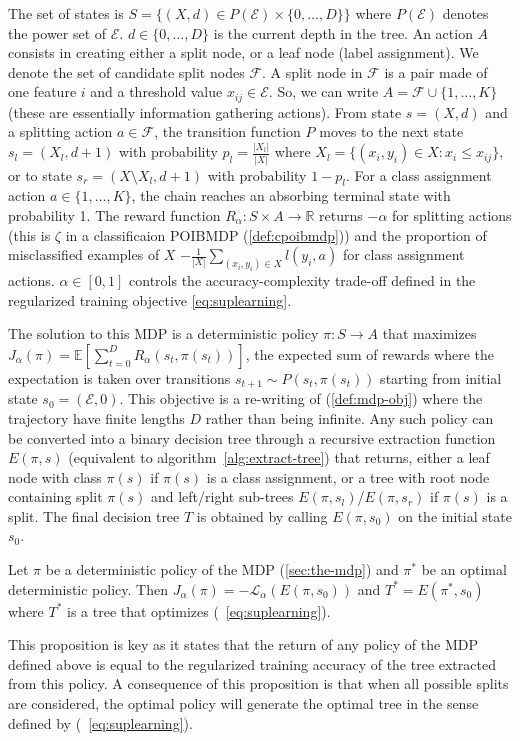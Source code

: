 The set of states is $S = \{ (X, d) \in P(\mathcal{E}) \times \{0, \ldots, D\} \}$ where $P(\mathcal{E})$ denotes the power set of $\mathcal{E}$. $d \in \{0,\ldots,D\}$ is the current depth in the tree.
An action $A$ consists in creating either a split node, or a leaf node (label assignment). We denote the set of candidate split nodes $ {\mathcal F} $. A split node in $\mathcal F$ is a pair made of one feature $i$ and a threshold value $x_{ij}\in \mathcal{E}$.
So, we can write $A = {\mathcal{F} \cup \{ 1, \ldots, K \}}$ (these are essentially information gathering actions).
From state $s=(X,d)$ and a splitting action $a \in {\mathcal F}$, the transition function $P$ moves to the next state $s_l = (X_l, d+1)$ with probability $p_l = \frac{|X_l|}{|X|}$ where $X_l = \{(x_i, y_i) \in X: x_i \leq x_{ij}\}$, or to state $s_r = (X \setminus X_l, d+1)$ with probability $1-p_l$. For a class assignment action $a \in \{1,\ldots,K\}$, the chain reaches an absorbing terminal state with probability 1. 
The reward function $R_{\alpha}: S \times A \rightarrow \mathbb{R}$ returns $-\alpha$ for splitting actions (this is $\zeta$ in a classificaion POIBMDP (\ref{def:cpoibmdp})) and the proportion of misclassified examples of $X$ $-\frac{1}{|X|}\sum_{(x_i,y_i) \in X} l(y_i, a)$ for class assignment actions. $\alpha \in [0,1]$ controls the accuracy-complexity trade-off defined in the regularized training objective \ref{eq:suplearning}. 

The solution to this MDP is a deterministic policy $\pi: S \rightarrow A$ that maximizes {$J_{\alpha}(\pi) ={\mathbb{E}}\left[\sum_{t = 0}^D R_{\alpha}(s_t, \pi(s_t))\right]$\label{def:finite-mdp-obj}}, the expected sum of rewards where the expectation is taken over transitions $s_{t+1}\sim P(s_t, \pi(s_t))$ starting from initial state $s_0 = (\mathcal{E}, 0)$.
This objective is a re-writing of (\ref{def:mdp-obj}) where the trajectory have finite lengths $D$ rather than being infinite.
Any such policy can be converted into a binary decision tree through a recursive extraction function $E(\pi, s)$ (equivalent to algorithm~\ref{alg:extract-tree}) that returns, either a leaf node with class $\pi(s)$ if $\pi(s)$ is a class assignment, or a tree with root node containing split $\pi(s)$ and left/right sub-trees $E(\pi, s_l)$/$E(\pi, s_r)$ if $\pi(s)$ is a split. The final decision tree $T$ is obtained by calling $E(\pi, s_0)$ on the initial state $s_0$. 

\begin{proposition}\label{prop:equiv}
Let $\pi$ be a deterministic policy of the MDP (\ref{sec:the-mdp}) and $\pi^*$ be an optimal deterministic policy. 
Then $J_\alpha(\pi) = -{\mathcal L}_\alpha(E(\pi, s_0))$ and $T^* = E(\pi^*, s_0)$ where $T^*$ is a tree that optimizes (~\ref{eq:suplearning}).
\end{proposition}
This proposition is key as it states that the return of any policy of the MDP defined above is equal to the regularized training accuracy of the tree extracted from this policy.
A consequence of this proposition is that when all possible splits are considered, the optimal policy will generate the optimal tree in the sense defined by (~\eqref{eq:suplearning}).


